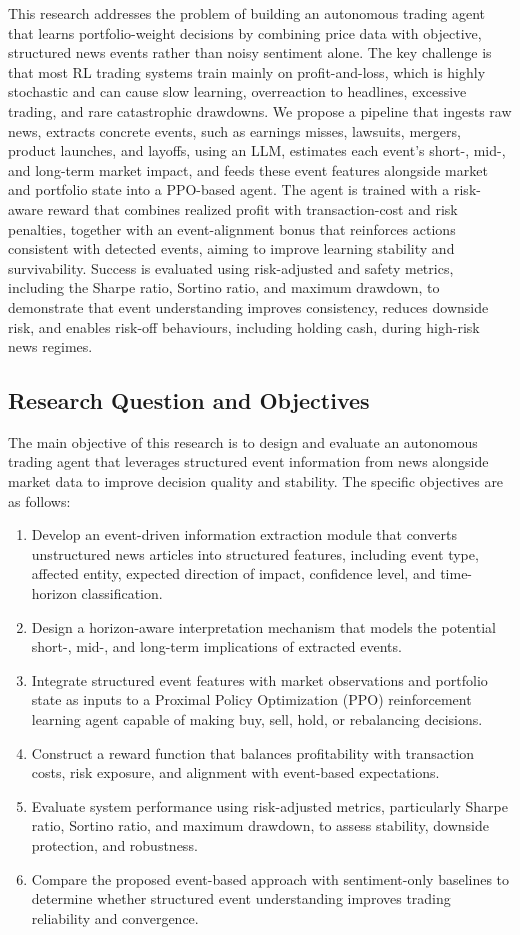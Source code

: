 \documentclass[a4paper,fleqn]{cas-sc}
\begin{document}
This research addresses the problem of building an autonomous trading agent that learns portfolio-weight decisions by combining price data with objective, structured news events rather than noisy sentiment alone. The key challenge is that most RL trading systems train mainly on profit-and-loss, which is highly stochastic and can cause slow learning, overreaction to headlines, excessive trading, and rare catastrophic drawdowns. We propose a pipeline that ingests raw news, extracts concrete events, such as earnings misses, lawsuits, mergers, product launches, and layoffs, using an LLM, estimates each event’s short-, mid-, and long-term market impact, and feeds these event features alongside market and portfolio state into a PPO-based agent. The agent is trained with a risk-aware reward that combines realized profit with transaction-cost and risk penalties, together with an event-alignment bonus that reinforces actions consistent with detected events, aiming to improve learning stability and survivability. Success is evaluated using risk-adjusted and safety metrics, including the Sharpe ratio, Sortino ratio, and maximum drawdown, to demonstrate that event understanding improves consistency, reduces downside risk, and enables risk-off behaviours, including holding cash, during high-risk news regimes. 
\subsection{Research Question and Objectives}\label{sec:Research}
The main objective of this research is to design and evaluate an autonomous
trading agent that leverages structured event information from news alongside
market data to improve decision quality and stability. The specific objectives
are as follows:
\begin{enumerate}
  \item Develop an event-driven information extraction module that converts
        unstructured news articles into structured features, including event
        type, affected entity, expected direction of impact, confidence level,
        and time-horizon classification.
  \item Design a horizon-aware interpretation mechanism that models the potential
        short-, mid-, and long-term implications of extracted events.
  \item Integrate structured event features with market observations and
        portfolio state as inputs to a Proximal Policy Optimization (PPO)
        reinforcement learning agent capable of making buy, sell, hold, or
        rebalancing decisions.
  \item Construct a reward function that balances profitability with transaction
        costs, risk exposure, and alignment with event-based expectations.
  \item Evaluate system performance using risk-adjusted metrics, particularly
        Sharpe ratio, Sortino ratio, and maximum drawdown, to assess stability,
        downside protection, and robustness.
  \item Compare the proposed event-based approach with sentiment-only baselines
        to determine whether structured event understanding improves trading
        reliability and convergence.
\end{enumerate}
\end{document}
